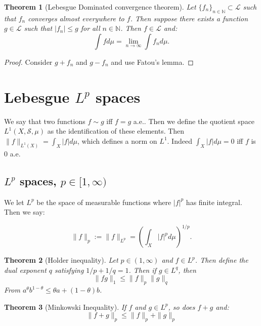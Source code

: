\documentclass{article}
\newtheorem{theorem}{Theorem}
\theoremstyle{definition}
\numberwithin{theorem}{section}
\numberwithin{equation}{section}
\begin{document}
\begin{theorem}[Lebesgue Dominated convergence theorem]
	Let $\lbrace f_n \rbrace_{n \in \mathbb{N}} \subset \mathcal{L}$ such that $f_n$ converges almost everywhere to $f$. Then suppose there exists a function $g \in \mathcal{L}$ such that $|f_n| \leq g$ for all $n \in \mathbb{N}$. Then $f \in \mathcal{L}$ and:
	\begin{equation}
		\int f d\mu = \lim_{n \rightarrow \infty} \int f_n d\mu.
	\end{equation}
\end{theorem}
\begin{proof}
	Consider $g + f_n$ and $g - f_n$ and use Fatou's lemma. 
\end{proof}

\section{Lebesgue $L^p$ spaces}
We say that two functions $f\sim g$ iff $f = g$ a.e.. Then we define the quotient space $L^1(X, \mathcal{S}, \mu)$ as the identification of these elements. Then $\|f \|_{L^1(X)} = \int_X |f| d\mu$, which defines a norm on $L^1$. Indeed $\int_X |f| d\mu = 0$ iff $f$ is 0 a.e. 

\subsection{$L^p$ spaces, $p \in [1, \infty)$}
We let $L^p$ be the space of measurable functions where $|f|^p$ has finite integral. Then we say:

\begin{equation}
	\|f \|_p := \|f\|_{L^p} = \left(\int_X |f|^p d\mu \right)^{1/p}.
\end{equation}


\begin{theorem}[Holder inequality]
	Let $p \in (1, \infty)$ and $f \in L^p$. Then define the dual exponent $q$ satisfying $1/p + 1/q = 1$. Then if $g \in L^q$, then 
	\begin{equation}
		\| fg \|_1 \leq \|f \|_p \| g \|_q
	\end{equation}
	From $a^\theta b^{1-\theta} \leq \theta a + (1 - \theta) b$. 
\end{theorem}

\begin{theorem}[Minkowski Inequality]
	If $f$ and $g \in L^p$, so does $f + g$ and:
	\begin{equation}
	\| f + g \|_p \leq \|f \|_p + \| g \|_p
\end{equation}
\end{theorem}
\end{document}
